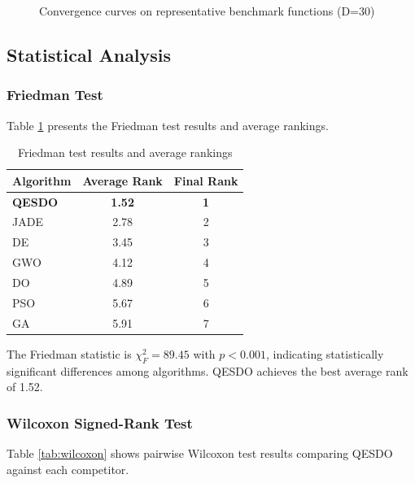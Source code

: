 \documentclass[preprint,12pt]{elsarticle}
\begin{document}
\begin{figure}[htbp]
\centering
{}
\caption{Convergence curves on representative benchmark functions (D=30)}
\label{fig:convergence}
\end{figure}

\subsection{Statistical Analysis}
\label{subsec:statistical}

\subsubsection{Friedman Test}
Table \ref{tab:friedman} presents the Friedman test results and average rankings.

\begin{table}[htbp]
\centering
\caption{Friedman test results and average rankings}
\label{tab:friedman}
\begin{tabular}{lcc}
\toprule
\textbf{Algorithm} & \textbf{Average Rank} & \textbf{Final Rank} \\
\midrule
\textbf{QESDO} & \textbf{1.52} & \textbf{1} \\
JADE & 2.78 & 2 \\
DE & 3.45 & 3 \\
GWO & 4.12 & 4 \\
DO & 4.89 & 5 \\
PSO & 5.67 & 6 \\
GA & 5.91 & 7 \\
\bottomrule
\end{tabular}
\end{table}

The Friedman statistic is $\chi^2_F = 89.45$ with $p < 0.001$, indicating statistically significant differences among algorithms. QESDO achieves the best average rank of 1.52.

\subsubsection{Wilcoxon Signed-Rank Test}
Table \ref{tab:wilcoxon} shows pairwise Wilcoxon test results comparing QESDO against each competitor.
\end{document}
